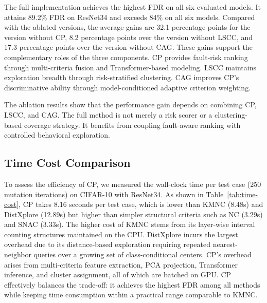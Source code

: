 \documentclass[preprint,number,5p,twocolumn]{elsarticle}
\begin{document}
The full implementation achieves the highest FDR on all six evaluated models. It attains 89.2\% FDR on ResNet34 and exceeds 84\% on all six models. Compared with the ablated versions, the average gains are 32.1 percentage points for the version without CP, 8.2 percentage points over the version without LSCC, and 17.3 percentage points over the version without CAG. These gains support the complementary roles of the three components. CP provides fault-risk ranking through multi-criteria fusion and Transformer-based modeling. LSCC maintains exploration breadth through risk-stratified clustering. CAG improves CP's discriminative ability through model-conditioned adaptive criterion weighting.

The ablation results show that the performance gain depends on combining CP, LSCC, and CAG. The full method is not merely a risk scorer or a clustering-based coverage strategy. It benefits from coupling fault-aware ranking with controlled behavioral exploration.

\subsection{Time Cost Comparison}

To assess the efficiency of CP, we measured the wall-clock time per test case (250 mutation iterations) on CIFAR-10 with ResNet34. As shown in Table~\ref{tab:time-cost}, CP takes 8.16 seconds per test case, which is lower than KMNC (8.48s) and DistXplore (12.89s) but higher than simpler structural criteria such as NC (3.29s) and SNAC (3.33s). The higher cost of KMNC stems from its layer-wise interval counting structures maintained on the CPU. DistXplore incurs the largest overhead due to its distance-based exploration requiring repeated nearest-neighbor queries over a growing set of class-conditional centers. CP's overhead arises from multi-criteria feature extraction, PCA projection, Transformer inference, and cluster assignment, all of which are batched on GPU. CP effectively balances the trade-off: it achieves the highest FDR among all methods while keeping time consumption within a practical range comparable to KMNC.

\begin{table}[!htbp]
  \centering
  \caption{Time cost per test case (250 iterations, seconds) on CIFAR-10 with ResNet34}\label{tab:time-cost}
  \scriptsize
\end{table}
\end{document}
